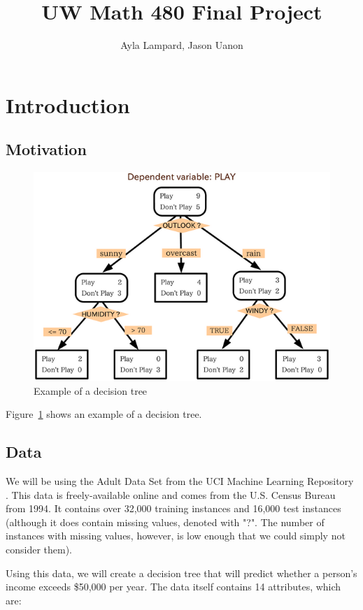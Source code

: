 \documentclass[twocolumn]{article}
\title{UW Math 480 Final Project}
\author{Ayla Lampard, Jason Uanon}
\begin{document}
\maketitle
\section{Introduction}

\subsection{Motivation}
\begin{figure}
    \centering
    \includegraphics[width=\textwidth]{figs/decision_tree.png}
    \caption{Example of a decision tree}
    \label{decision_tree}
\end{figure}

Figure~\ref{decision_tree} shows an example of a decision tree.

\subsection{Data}
We will be using the Adult Data Set from the UCI Machine Learning Repository \cite{bache-lichman}. This data is freely-available online and comes from the U.S. Census Bureau from 1994. It contains over 32,000 training instances and 16,000 test instances (although it does contain missing values, denoted with "?". The number of instances with missing values, however, is low enough that we could simply not consider them). 

Using this data, we will create a decision tree that will predict whether a person's income exceeds \$50,000 per year. The data itself contains 14 attributes, which are:
\end{document}
